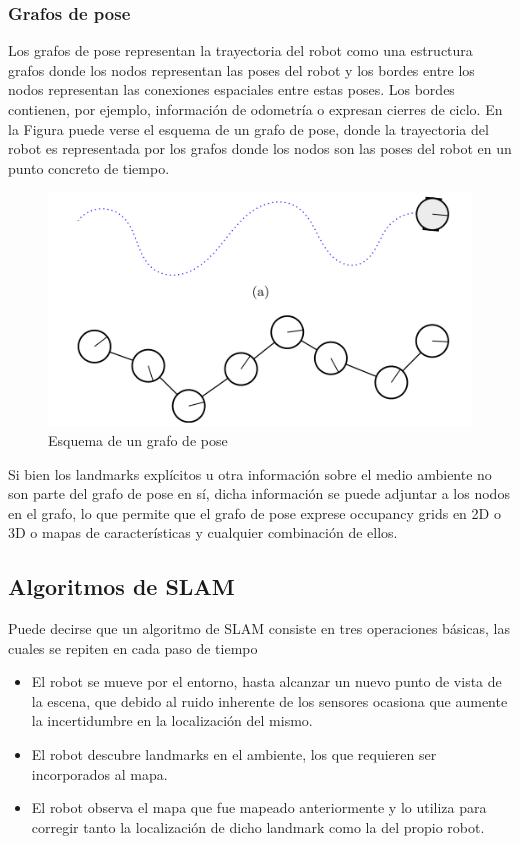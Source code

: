 \subsubsection{Grafos de pose}
Los grafos de pose representan la trayectoria del robot como una estructura grafos donde los nodos representan las poses del robot y los bordes entre los nodos representan las conexiones espaciales entre estas poses. Los bordes contienen, por ejemplo, información de odometría o expresan cierres de ciclo. En la Figura puede verse el esquema de un grafo de pose, donde la trayectoria del robot es representada por los grafos donde los nodos son las poses del robot en un punto concreto de tiempo.
\begin{figure}[!ht]
    \centering
    \includegraphics[width=\textwidth]{Img/PoseGraphStructure.png}
    \caption{Esquema de un grafo de pose}
    \label{fig:posegraphstructure}
\end{figure}

Si bien los landmarks explícitos u otra información sobre el medio ambiente no son parte del grafo de pose en sí, dicha información se puede adjuntar a los nodos en el grafo, lo que permite que el grafo de pose exprese occupancy grids en 2D o 3D o mapas de características y cualquier combinación de ellos.

\ifimagenes
\else
\subsection{Algoritmos de SLAM}
Puede decirse que un algoritmo de SLAM consiste en tres operaciones básicas, las cuales se repiten en cada paso de tiempo
\begin{itemize}
    \item El robot se mueve por el entorno, hasta alcanzar un nuevo punto de vista de la escena, que debido al ruido inherente de los sensores ocasiona que aumente la incertidumbre en la localización del mismo.
    \item El robot descubre landmarks en el ambiente, los que requieren ser incorporados al mapa.
    \item El robot observa el mapa que fue mapeado anteriormente y lo utiliza para corregir tanto la localización de dicho landmark como la del propio robot.
\end{itemize}


